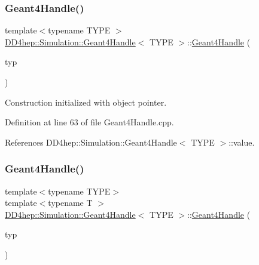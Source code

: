 \subsubsection{\texorpdfstring{Geant4\+Handle()}{Geant4Handle()}\hspace{0.1cm}{\footnotesize\ttfamily [2/20]}}
{\footnotesize\ttfamily template$<$typename T\+Y\+PE $>$ \\
\hyperlink{class_d_d4hep_1_1_simulation_1_1_geant4_handle}{D\+D4hep\+::\+Simulation\+::\+Geant4\+Handle}$<$ T\+Y\+PE $>$\+::\hyperlink{class_d_d4hep_1_1_simulation_1_1_geant4_handle}{Geant4\+Handle} (\begin{DoxyParamCaption}\item[{\hyperlink{class_d_d4hep_1_1_simulation_1_1_geant4_handle_a35e583b9228e38c95d23112ad19b645d}{handled\+\_\+type} $\ast$}]{typ }\end{DoxyParamCaption})}



Construction initialized with object pointer. 



Definition at line 63 of file Geant4\+Handle.\+cpp.



References D\+D4hep\+::\+Simulation\+::\+Geant4\+Handle$<$ T\+Y\+P\+E $>$\+::value.

\hypertarget{class_d_d4hep_1_1_simulation_1_1_geant4_handle_a6a8897eeec383f6599c6f08f607dace5}{}\label{class_d_d4hep_1_1_simulation_1_1_geant4_handle_a6a8897eeec383f6599c6f08f607dace5} 
\subsubsection{\texorpdfstring{Geant4\+Handle()}{Geant4Handle()}\hspace{0.1cm}{\footnotesize\ttfamily [3/20]}}
{\footnotesize\ttfamily template$<$typename T\+Y\+PE$>$ \\
template$<$typename T $>$ \\
\hyperlink{class_d_d4hep_1_1_simulation_1_1_geant4_handle}{D\+D4hep\+::\+Simulation\+::\+Geant4\+Handle}$<$ T\+Y\+PE $>$\+::\hyperlink{class_d_d4hep_1_1_simulation_1_1_geant4_handle}{Geant4\+Handle} (\begin{DoxyParamCaption}\item[{\hyperlink{class_t}{T} $\ast$}]{typ }\end{DoxyParamCaption})\hspace{0.3cm}{\ttfamily [inline]}}



